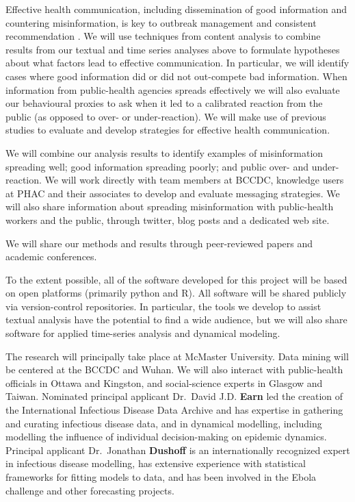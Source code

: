 
Effective health communication, including dissemination of good information and countering misinformation, is key to outbreak management \citep{SongSong17} and consistent recommendation \citep{OhlrSugg18,SongSong17}.
We will use techniques from content analysis \citep{Finf13 ,Mayr14} to combine results from our textual and time series analyses above to formulate hypotheses about what factors lead to effective communication. In particular, we will identify cases where good information did or did not out-compete bad information. When information from public-health agencies spreads effectively we will also evaluate our behavioural proxies to ask when it led to a calibrated reaction from the public (as opposed to over- or under-reaction).
We will make use of previous studies to evaluate \citep{Ding14,FarmSher18,NowaShee15,Tam18} and develop \citep{BekaBigm18, ShenShee15, SongSong17} strategies for effective health communication.


 We will combine our analysis results to identify examples of misinformation spreading well; good information spreading poorly; and public over- and under-reaction. We will work directly with team members at BCCDC, knowledge users at PHAC and their associates to develop and evaluate messaging strategies. We will also share information about spreading misinformation with public-health workers and the public, through twitter, blog posts and a dedicated web site. 

 We will share our methods and results through peer-reviewed papers and academic conferences. 

 To the extent possible, all of the software developed for this project will be based on open platforms (primarily python and R). All software will be shared publicly via version-control repositories. In particular, the tools we develop to assist textual analysis have the potential to find a wide audience, but we will also share software for applied time-series analysis and dynamical modeling.


The research will principally take place at McMaster University. Data mining will be centered at the BCCDC and Wuhan. We will also interact with public-health officials in Ottawa and Kingston, and social-science experts in Glasgow and Taiwan.
Nominated principal applicant Dr.\ David J.D. \textbf{Earn} led the creation of the International Infectious Disease Data Archive and has expertise in gathering and curating infectious disease data, and in dynamical modelling, including modelling the influence of individual decision-making on epidemic dynamics.
Principal applicant Dr.\ Jonathan \textbf{Dushoff} is an internationally recognized expert in infectious disease modelling, has extensive experience with statistical frameworks for fitting models to data, and has been involved in the Ebola challenge and other forecasting projects.

